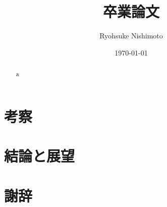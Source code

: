 \documentclass[a4j,11pt,titlepage,report]{jsbook}
\title{卒業論文}
\author{Ryohsuke Nishimoto}
\date{\today}
\begin{document}
\maketitle
{}
\setcounter{tocdepth}{3}
\tableofcontents

\clearpage
{}

\begin{abstract}
	a
\end{abstract}


	





		
\section{考察}
\section{結論と展望}
\section*{謝辞}
\begin{thebibliography}{99}
\end{thebibliography}


%
%
%
%
%
%
%
\end{document}
